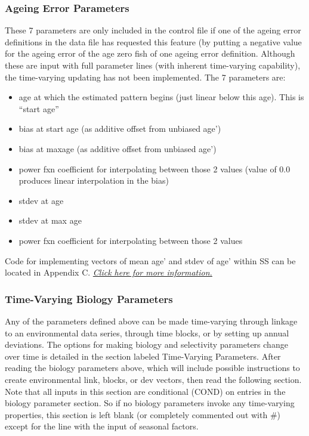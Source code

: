 \subsubsection{Ageing Error Parameters}
These 7 parameters are only included in the control file if one of the ageing error definitions in the data file has requested this feature (by putting a negative value for the ageing error of the age zero fish of one ageing error definition.  Although these are input with full parameter lines (with inherent time-varying capability), the time-varying updating has not been implemented. The 7 parameters are:
\begin{itemize}
	\item age at which the estimated pattern begins (just linear below this age).  This is “start age”
	\item bias at start age (as additive offset from unbiased age’)
	\item bias at maxage (as additive offset from unbiased age’)
	\item power fxn coefficient for interpolating between those 2 values (value of 0.0 produces linear interpolation in the bias)
	\item stdev at age
	\item stdev at max age
	\item power fxn coefficient for interpolating between those 2 values
\end{itemize}

\noindent Code for implementing vectors of mean age' and stdev of age' within SS can be located in Appendix C. \hyperlink{AgeingError}{\textit{Click here for more information.}}

\subsubsection{Time-Varying Biology Parameters}
Any of the parameters defined above can be made time-varying through linkage to an environmental data series, through time blocks, or by setting up annual deviations.  The options for making biology and selectivity parameters change over time is detailed in the section labeled Time-Varying Parameters.  After reading the biology parameters above, which will include possible instructions to create environmental link, blocks, or dev vectors, then read the following section.  Note that all inputs in this section are conditional (COND) on entries in the biology parameter section.  So if no biology parameters invoke any time-varying properties, this section is left blank (or completely commented out with \#) except for the line with the input of seasonal factors.

